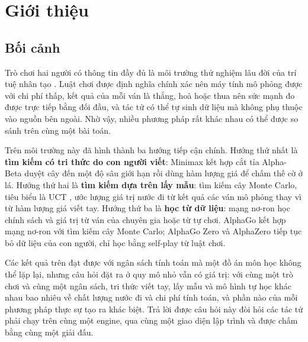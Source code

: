 \chapter{Giới thiệu}
\label{ch:gioi-thieu}

\section{Bối cảnh}
\label{sec:gt-boi-canh}
Trò chơi hai người có thông tin đầy đủ là môi trường thử nghiệm lâu đời của trí tuệ nhân tạo \cite{russell2021aima}. Luật chơi được định nghĩa chính xác nên máy tính mô phỏng được với chi phí thấp, kết quả của mỗi ván là thắng, hoà hoặc thua nên sức mạnh đo được trực tiếp bằng đối đầu, và tác tử có thể tự sinh dữ liệu mà không phụ thuộc vào nguồn bên ngoài. Nhờ vậy, nhiều phương pháp rất khác nhau có thể được so sánh trên cùng một bài toán.

Trên môi trường này đã hình thành ba hướng tiếp cận chính. Hướng thứ nhất là \textbf{tìm kiếm có tri thức do con người viết}: Minimax kết hợp cắt tỉa Alpha-Beta \cite{knuth1975alphabeta} duyệt cây đến một độ sâu giới hạn rồi dùng hàm lượng giá để chấm thế cờ ở lá. Hướng thứ hai là \textbf{tìm kiếm dựa trên lấy mẫu}: tìm kiếm cây Monte Carlo, tiêu biểu là UCT \cite{kocsis2006uct,browne2012mcts}, ước lượng giá trị nước đi từ kết quả các ván mô phỏng thay vì từ hàm lượng giá viết tay. Hướng thứ ba là \textbf{học từ dữ liệu}: mạng nơ-ron học chính sách và giá trị từ ván của chuyên gia hoặc từ tự chơi. AlphaGo \cite{silver2016alphago} kết hợp mạng nơ-ron với tìm kiếm cây Monte Carlo; AlphaGo Zero và AlphaZero \cite{silver2017alphagozero,silver2018alphazero} tiếp tục bỏ dữ liệu của con người, chỉ học bằng self-play từ luật chơi.

Các kết quả trên đạt được với ngân sách tính toán mà một đồ án môn học không thể lặp lại, nhưng câu hỏi đặt ra ở quy mô nhỏ vẫn có giá trị: với cùng một trò chơi và cùng một ngân sách, tri thức viết tay, lấy mẫu và mô hình tự học khác nhau bao nhiêu về chất lượng nước đi và chi phí tính toán, và phần nào của mỗi phương pháp thực sự tạo ra khác biệt. Trả lời được câu hỏi này đòi hỏi các tác tử phải chạy trên cùng một engine, qua cùng một giao diện lập trình và được chấm bằng cùng một giải đấu.

